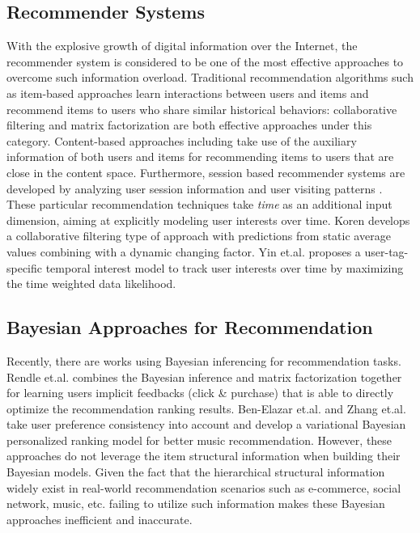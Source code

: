 \subsection{Recommender Systems}
With the explosive growth of digital information over the Internet, the recommender system is considered to be one of the most effective approaches to overcome such information overload. Traditional recommendation algorithms such as item-based approaches learn interactions between users and items and recommend items to users who share similar historical behaviors: collaborative filtering \cite{Sarwar:2001:ICF:371920.372071,Su:2009:SCF:1592474.1722966} and matrix factorization \cite{Rendle:2010:FPM} are both effective approaches under this category.  Content-based approaches including \cite{2011rsh..book...73L,Liu:2011,Yuan:2015} take use of the auxiliary information of both users and items for recommending items to users that are close in the content space.  Furthermore, session based recommender systems are developed by analyzing user session information and user visiting patterns \cite{Gultekin_acollaborative,Tang_review:2013}. These particular recommendation techniques take \emph{time} as an additional input dimension, aiming at explicitly modeling user interests over time.  Koren \cite{Koren:2010} develops a collaborative filtering type of approach with predictions from static average values combining with a dynamic changing factor. Yin et.al. \cite{Yin:2011} proposes a user-tag-specific temporal interest model to track user interests over time by maximizing the time weighted data likelihood.  %

\subsection{Bayesian Approaches for Recommendation}
Recently, there are works using Bayesian inferencing for recommendation tasks.  Rendle et.al. \cite{rendle2009bpr} combines the Bayesian inference and matrix factorization together for learning users implicit feedbacks (click \& purchase) that is able to directly optimize the recommendation ranking results. Ben-Elazar et.al. \cite{Ben-Elazar:2017} and Zhang et.al. \cite{zhang2007efficient} take user preference consistency into account and develop a variational Bayesian personalized ranking model for better music recommendation.  However, these approaches do not leverage the item structural information when building their Bayesian models.  Given the fact that the hierarchical structural information widely exist in real-world recommendation scenarios such as e-commerce, social network, music, etc. failing to utilize such information makes these Bayesian approaches inefficient and inaccurate.  

